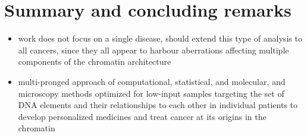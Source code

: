 \section{Summary and concluding remarks}

\begin{itemize}
  \item work does not focus on a single disease, should extend this type of analysis to all cancers, since they all appear to harbour aberrations affecting multiple components of the chromatin architecture
  \item multi-pronged approach of computational, statistical, and molecular, and microscopy methods optimized for low-input samples targeting the set of DNA elements and their relationships to each other in individual patients to develop personalized medicines and treat cancer at its origins in the chromatin
\end{itemize}
